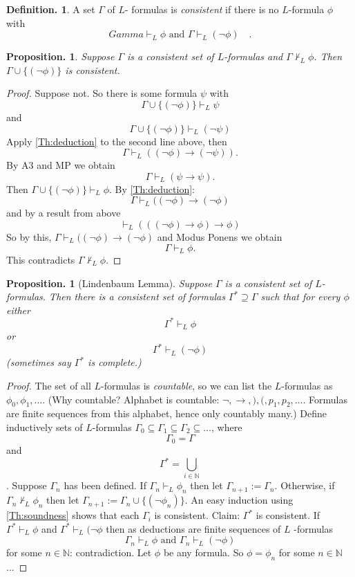 \documentclass[a4paper,oneside,11pt,DIV=12,parskip=half]{scrartcl}
\newcommand{\N}{\mathbb N}
\theoremstyle{plain}
\newtheorem{proposition}[theorem]{Proposition.}
\theoremstyle{definition}
\newtheorem{definition}[theorem]{Definition.}
\newtheorem{remark, definition}[theorem]{Remark and Definition.}
\newtheorem{lemma, definition}[theorem]{Lemma and Definition.}
\newtheorem{theorem, definition}[theorem]{Theorem and Definition.}
\theoremstyle{remark}
\newtheorem*{remark, example}{\textbf{Remark and Exercise}}
\begin{document}
\begin{definition}
A set $\Gamma$ of $L$- formulas is \emph{consistent} if there is no $L$-formula $\phi$ with
    \[Gamma \vdash_L \phi \text{ and } \Gamma \vdash_L (\lnot \phi) \quad . \]
\end{definition}

\begin{proposition}
Suppose $\Gamma$ is a consistent set of $L$-formulas and $\Gamma \not \vdash_L \phi$. Then $\Gamma \cup \{(\lnot \phi)\}$ is consistent.
\end{proposition}
\begin{proof}
Suppose not. So there is some formula $\psi$ with
\[ \Gamma \cup \{(\lnot \phi) \} \vdash_L \psi \] and
\[ \Gamma \cup \{(\lnot \phi) \} \vdash_L (\lnot \psi) \]
Apply \ref{Th:deduction} to the second line above, then
\[ \Gamma \vdash_L ((\lnot \phi) \rightarrow (\lnot \psi)). \]
By A3 and MP we obtain
\[ \Gamma \vdash_L (\psi \rightarrow \psi). \]
Then $\Gamma \cup \{(\lnot \phi) \} \vdash_L \phi$. By \ref{Th:deduction}: 
\[ \Gamma \vdash_L ((\lnot \phi) \rightarrow (\lnot \phi)  \]
and by a result from above
    \[ \vdash_L (((\lnot \phi) \rightarrow \phi) \rightarrow \phi) \]
So by this, $ \Gamma \vdash_L ((\lnot \phi) \rightarrow (\lnot \phi)$   and Modus Ponens we obtain
\[ \Gamma \vdash_L \phi. \]
This contradicts $\Gamma \not \vdash_L \phi$.
\end{proof}

\begin{proposition}[Lindenbaum Lemma]
Suppose $\Gamma$ is a consistent set of $L$-formulas. Then there is a consistent set of formulas
$ \Gamma^* \supseteq \Gamma$ such that for every $\phi$ either
    \[\Gamma^* \vdash_L \phi \] or
    \[\Gamma^* \vdash_L (\lnot \phi)\]
    (sometimes say $\Gamma^*$ is \emph{complete}.) 
\end{proposition}

\begin{proof}
The set of all $L$-formulas is \emph{countable}, so we can list the $L$-formulas as $\phi_0,\phi_1,\dots$.
(Why countable? Alphabet is countable: $\lnot, \rightarrow,),(,p_1,p_2,\dots$. Formulas are finite sequences from this alphabet, hence only countably many.)
Define inductively sets of $L$-formulas $\Gamma_0 \subseteq \Gamma_1 \subseteq \Gamma_2\subseteq \dots$, where 
\[ \Gamma_0 = \Gamma\] and \[\Gamma^* = \bigcup_{i \in \N}\]. Suppose $\Gamma_n$ has been defined. If $\Gamma_n \vdash_L \phi_n$ then let $\Gamma_{n+1} := \Gamma_n$.
Otherwise, if $\Gamma_n \not \vdash_L \phi_n$ then let $\Gamma_{n+1} := \Gamma_n \cup \{(\lnot \phi_n)\}$. An easy induction using \ref{Th:soundness} shows that each $\Gamma_i$ is consistent.
Claim: $\Gamma^*$ is consistent.
If $\Gamma^* \vdash_L \phi$ and $\Gamma^* \vdash_L (\lnot \phi$ then as deductions are finite sequences of $L$ -formulas \[ \Gamma_n \vdash_L \phi \text{ and } \Gamma_n \vdash_L (\lnot \phi) \] for some $n \in \N$: contradiction.
Let $\phi$ be any formula. So $\phi = \phi_n$ for some $n \in \N$...
\end{proof}
\end{document}
